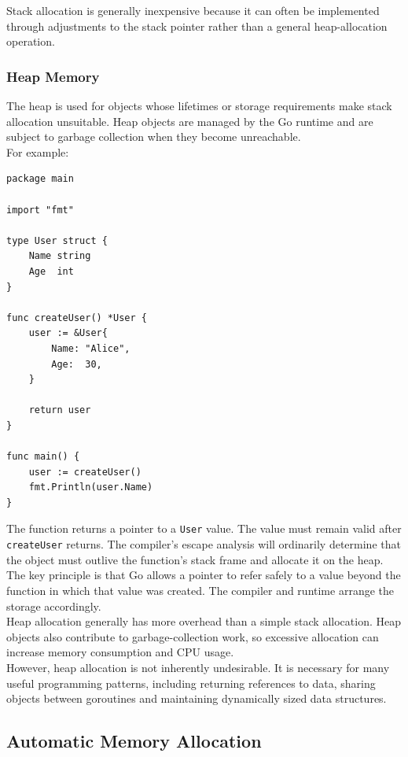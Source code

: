 Stack allocation is generally inexpensive because it can often be implemented through adjustments to the stack pointer rather than a general heap-allocation operation.

\subsubsection{Heap Memory}

The heap is used for objects whose lifetimes or storage requirements make stack allocation unsuitable. Heap objects are managed by the Go runtime and are subject to garbage collection when they become unreachable.\\

For example:

\begin{lstlisting}
package main

import "fmt"

type User struct {
    Name string
    Age  int
}

func createUser() *User {
    user := &User{
        Name: "Alice",
        Age:  30,
    }

    return user
}

func main() {
    user := createUser()
    fmt.Println(user.Name)
}
\end{lstlisting}

The function returns a pointer to a \texttt{User} value. The value must remain valid after \texttt{createUser} returns. The compiler's escape analysis will ordinarily determine that the object must outlive the function's stack frame and allocate it on the heap.\\

The key principle is that Go allows a pointer to refer safely to a value beyond the function in which that value was created. The compiler and runtime arrange the storage accordingly.\\

Heap allocation generally has more overhead than a simple stack allocation. Heap objects also contribute to garbage-collection work, so excessive allocation can increase memory consumption and CPU usage.\\

However, heap allocation is not inherently undesirable. It is necessary for many useful programming patterns, including returning references to data, sharing objects between goroutines and maintaining dynamically sized data structures.

\subsection{Automatic Memory Allocation}

